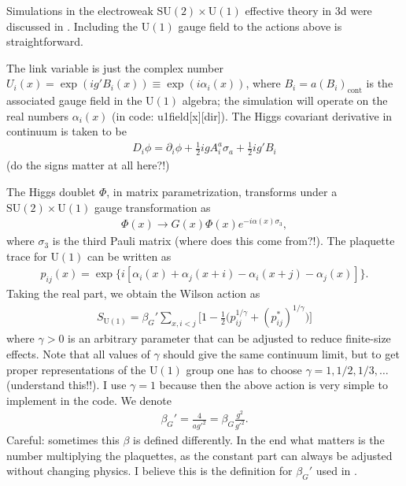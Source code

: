 \documentclass[11pt,a4paper]{article}
\newcommand\gr[1]{\mathrm{#1}}%
\newcommand\lauri[1]{{\color{myorange}#1}}
\begin{document}
Simulations in the electroweak $\gr{SU(2) \times U(1)}$ effective theory in 3d were discussed in \cite{Kajantie:1996qd}. Including the $\gr{U(1)}$ gauge field to the actions above is straightforward. 

The link variable is just the complex number $U_i(x) = \exp(i g' B_i(x)) \equiv \exp(i \alpha_i(x))$, where $B_i = a (B_i)_\text{cont}$ is the associated gauge field in the $\gr{U(1)}$ algebra; the simulation will operate on the real numbers $\alpha_i(x)$ (in code: u1field[x][dir]). The Higgs covariant derivative in continuum is taken to be 
\begin{align}
D_i \phi = \partial_i \phi + \frac12 i g A^a_i \sigma_a + \frac12 i g' B_i 
\end{align}
\lauri{(do the signs matter at all here?!)}

The Higgs doublet $\Phi$, in matrix parametrization, transforms under a $\gr{SU(2) \times U(1)}$ gauge transformation as 
\begin{align}
\Phi(x) \rightarrow G(x) \Phi(x) e^{-i \alpha(x)\sigma_3},
\end{align}
where $\sigma_3$ is the third Pauli matrix \lauri{(where does this come from?!)}. The plaquette trace for $\gr{U(1)}$ can be written as 
\begin{align}
p_{ij}(x) = \exp\{i[\alpha_i(x) + \alpha_j(x+i) - \alpha_i(x+j) - \alpha_j(x)]\}.
\end{align}
Taking the real part, we obtain the Wilson action as 
\begin{align}
S_\gr{U(1)} = \beta_G' \sum_{x, i<j} \Big[ 1 - \frac12 \Big(p_{ij}^{1/\gamma} + (p_{ij}^*)^{1/\gamma}\Big)\Big] 
\end{align}
where $\gamma > 0$ is an arbitrary parameter that can be adjusted to reduce finite-size effects. Note that all values of $\gamma$ should give the same continuum limit, but to get proper representations of the $\gr{U(1)}$ group one has to choose  $\gamma = 1, 1/2, 1/3, \dots$ \lauri{(understand this!!)}. I use $\gamma = 1$ because then the above action is very simple to implement in the code. We denote 
\begin{align}
\beta_G' = \frac{4}{a {g'}^2} = \beta_G \frac{g^2}{{g'}^2}.
\end{align}
\lauri{Careful:} sometimes this $\beta$ is defined differently. In the end what matters is the number multiplying the plaquettes, as the constant part can always be adjusted without changing physics. I believe this is the definition for $\beta_G'$ used in \cite{Kajantie:1996qd}.
\end{document}
